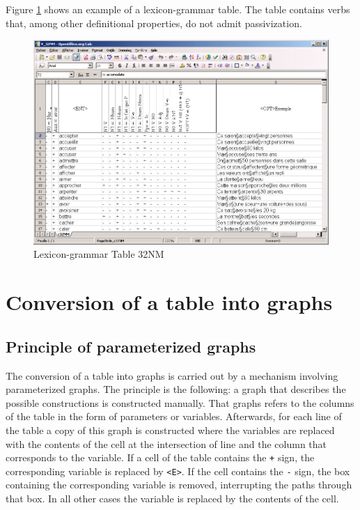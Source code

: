 \bigskip
\noindent Figure \ref{fig-table-32NM} shows an example of a lexicon-grammar table.
The table contains verbs that, among other definitional properties, do not admit
passivization.

\begin{figure}[!h]
\begin{center}
\includegraphics[width=15cm]{resources/img/fig8-1.png}
\caption{Lexicon-grammar Table 32NM\label{fig-table-32NM}}
\end{center}
\end{figure}

\section{Conversion of a table into graphs}
\subsection{Principle of parameterized graphs}
The conversion of a table into graphs is carried out by a mechanism involving
parameterized graphs. The principle is the following: a graph that describes the
possible constructions is constructed manually. That graphs refers to the columns
of the table in the form of parameters or variables. Afterwards, for each line of
the table a copy of this graph is constructed where the variables are replaced
with the contents of the cell at the intersection of line and the column that
corresponds to the variable. If a cell of the table contains the \verb$+$ sign,
the corresponding variable is replaced by \verb+<E>+. If the cell contains the
\verb+-+ sign,  the box containing the corresponding variable is removed,
interrupting the paths through that box. In all other cases the variable is
replaced by the contents of the cell.


